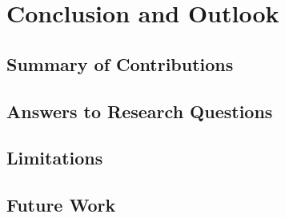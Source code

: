 \chapter{Conclusion and Outlook}\label{ch:conclusion}

\section{Summary of Contributions}
\label{sec:concl:summary}

\section{Answers to Research Questions}
\label{sec:concl:rq_answers}

\section{Limitations}
\label{sec:concl:limitations}

\section{Future Work}
\label{sec:concl:future_work}
